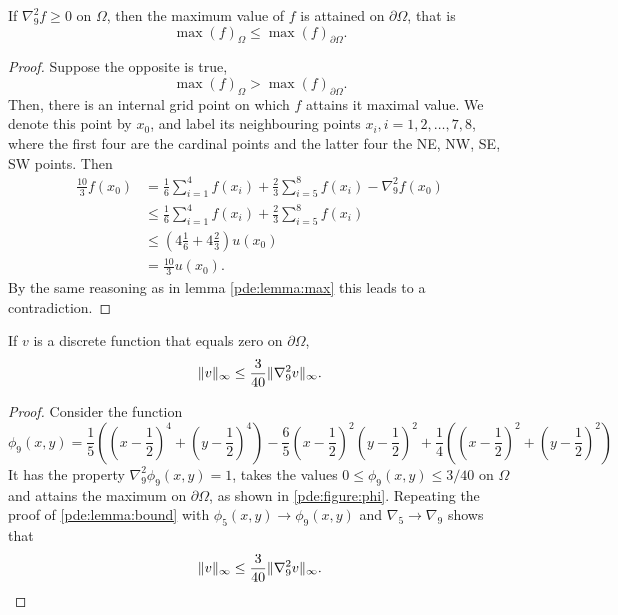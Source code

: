 \begin{lemma}\label{pde:lemma:max9}
If $\nabla_9^2 f \geq 0$ on $\Omega$, then the maximum value of $f$ is attained on $\partial \Omega$, that is
$$
\max(f)_\Omega \leq \max(f)_{\partial \Omega}.
$$
\end{lemma}
\begin{proof}
Suppose the opposite is true,
$$
\max(f)_\Omega > \max(f)_{\partial \Omega}.
$$
Then, there is an internal grid point on which $f$ attains it maximal value.
We denote this point by $x_0$, and label its neighbouring points $x_i, i = 1,2, \dots, 7, 8$, where the first four are the cardinal points and the latter four the NE, NW, SE, SW points.
Then
\begin{align*}
\frac{10}{3} f(x_0)
&= \frac{1}{6} \sum_{i=1}^4 f(x_i)
+ \frac{2}{3} \sum_{i=5}^8 f(x_i)
- \nabla_9^2 f(x_0)\\
&\leq \frac{1}{6} \sum_{i=1}^4 f(x_i)
+ \frac{2}{3} \sum_{i=5}^8 f(x_i)\\
&\leq
\left( 4\frac16 + 4\frac23 \right) u(x_0)\\
&= \frac{10}{3} u(x_0).
\end{align*}
By the same reasoning as in lemma \ref{pde:lemma:max} this leads to a contradiction.
\end{proof}

\begin{lemma}\label{pde:lemma:bound9}
  If $v$ is a discrete function that equals zero on $\partial \Omega$,
  $$
  \lVert v \rVert_\infty \leq \frac{3}{40} \lVert \nabla_9^2 v \rVert_\infty.
  $$
\end{lemma}
\newcommand{\phinine}{\frac{1}{5} \left(\left(x-\frac{1}{2}\right)^4+\left(y-\frac{1}{2}\right)^4\right) - \frac{6}{5} \left(x-\frac{1}{2}\right)^2\left(y-\frac{1}{2}\right)^2 + \frac{1}{4} \left(\left(x-\frac{1}{2}\right)^2+\left(y-\frac{1}{2}\right)^2\right)}
\begin{proof}
  Consider the function
  \begin{equation}
  \phi_9(x,y) = \phinine
  \label{pde:equation:phi9}
  \end{equation}
  It has the property $\nabla_9^2 \phi_9(x,y) = 1$, takes the values $0 \leq \phi_9(x,y) \leq 3/40$ on $\Omega$ and attains the maximum on $\partial \Omega$, as shown in \cref{pde:figure:phi}.
  Repeating the proof of \cref{pde:lemma:bound} with $\phi_5(x,y) \rightarrow \phi_9(x,y)$ and $\nabla_5 \rightarrow \nabla_9$ shows that
  $$
  \lVert v \rVert_\infty
  \leq \frac{3}{40} \lVert \nabla_9^2 v \rVert_\infty.
  $$
\end{proof}

